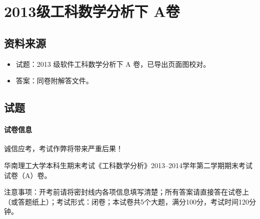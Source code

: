 \section{2013级工科数学分析下 A卷}

\subsection{资料来源}
\begin{itemize}
  \item 试题：2013 级软件工科数学分析下 A 卷，已导出页面图校对。
  \item 答案：同卷附解答文件。
\end{itemize}

\subsection{试题}

\paragraph*{试卷信息}
诚信应考，考试作弊将带来严重后果！

华南理工大学本科生期末考试《工科数学分析》2013--2014学年第二学期期末考试试卷（A）卷。

注意事项：开考前请将密封线内各项信息填写清楚；所有答案请直接答在试卷上（或答题纸上）；考试形式：闭卷；本试卷共5个大题，满分100分，考试时间120分钟。

